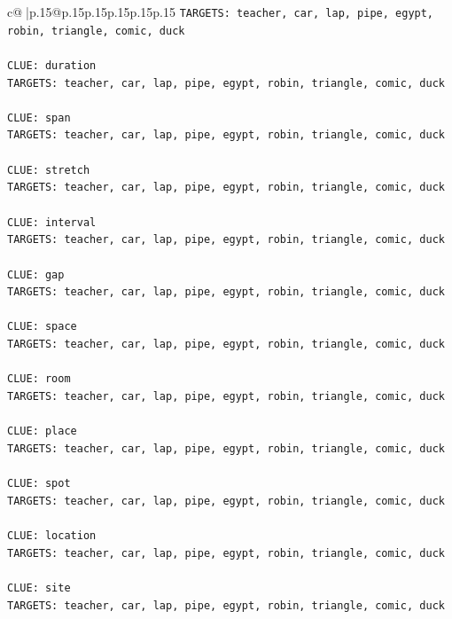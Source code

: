\documentclass{article}
\begin{document}
{\begin{supertabular}{c@{$\;$}|p{.15\linewidth}@{}p{.15\linewidth}p{.15\linewidth}p{.15\linewidth}p{.15\linewidth}p{.15\linewidth}}
{{{\texttt{TARGETS: teacher, car, lap, pipe, egypt, robin, triangle, comic, duck} \\
\\ 
\texttt{CLUE: duration} \\
\texttt{TARGETS: teacher, car, lap, pipe, egypt, robin, triangle, comic, duck} \\
\\ 
\texttt{CLUE: span} \\
\texttt{TARGETS: teacher, car, lap, pipe, egypt, robin, triangle, comic, duck} \\
\\ 
\texttt{CLUE: stretch} \\
\texttt{TARGETS: teacher, car, lap, pipe, egypt, robin, triangle, comic, duck} \\
\\ 
\texttt{CLUE: interval} \\
\texttt{TARGETS: teacher, car, lap, pipe, egypt, robin, triangle, comic, duck} \\
\\ 
\texttt{CLUE: gap} \\
\texttt{TARGETS: teacher, car, lap, pipe, egypt, robin, triangle, comic, duck} \\
\\ 
\texttt{CLUE: space} \\
\texttt{TARGETS: teacher, car, lap, pipe, egypt, robin, triangle, comic, duck} \\
\\ 
\texttt{CLUE: room} \\
\texttt{TARGETS: teacher, car, lap, pipe, egypt, robin, triangle, comic, duck} \\
\\ 
\texttt{CLUE: place} \\
\texttt{TARGETS: teacher, car, lap, pipe, egypt, robin, triangle, comic, duck} \\
\\ 
\texttt{CLUE: spot} \\
\texttt{TARGETS: teacher, car, lap, pipe, egypt, robin, triangle, comic, duck} \\
\\ 
\texttt{CLUE: location} \\
\texttt{TARGETS: teacher, car, lap, pipe, egypt, robin, triangle, comic, duck} \\
\\ 
\texttt{CLUE: site} \\
\texttt{TARGETS: teacher, car, lap, pipe, egypt, robin, triangle, comic, duck} \\
}}}
\end{supertabular}}
\end{document}
